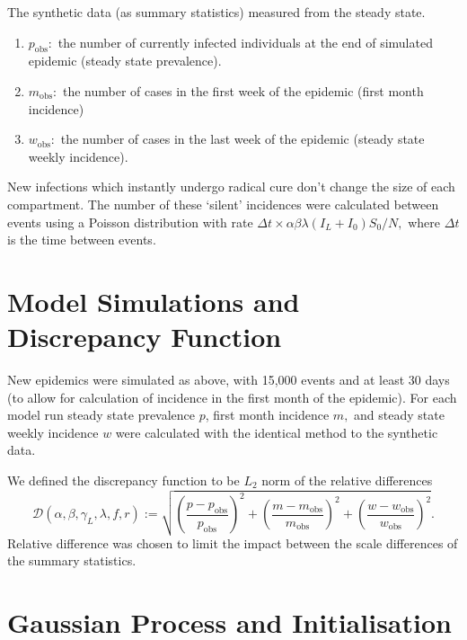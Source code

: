 The synthetic data (as summary statistics) measured from the steady state.
\begin{enumerate}
    \item $p_\text{obs}:$ the number of currently infected individuals at the
          end of simulated epidemic (steady state prevalence).
    \item $m_\text{obs}:$ the number of cases in the first week of the epidemic
          (first month incidence)
    \item $w_\text{obs}:$ the number of cases in the last week of the epidemic
          (steady state weekly incidence).
\end{enumerate}

New infections which instantly undergo radical cure don't change the size of
each compartment. The number of these `silent' incidences were calculated
between events using a Poisson distribution with rate
$\Delta t \times \alpha \beta \lambda (I_L + I_0) S_0 / N,$ where $\Delta t$ is
the time between events.

\section{Model Simulations and Discrepancy Function}

New epidemics were simulated as above, with 15,000 events and at least 30
days (to allow for calculation of incidence in the first month of the
epidemic). For each model run steady state prevalence $p$,
first month incidence $m,$ and steady state weekly incidence $w$ were
calculated with the identical method to the synthetic data.

We defined the discrepancy function to be $L_2$ norm of the relative
differences
$$
    \mathcal{D}(\alpha, \beta, \gamma_L, \lambda, f, r)
    := \sqrt{
        \left(\frac{p - p_\text{obs}}{p_\text{obs}}\right)^2
        + \left(\frac{m - m_\text{obs}}{m_\text{obs}}\right)^2
        + \left(\frac{w - w_\text{obs}}{w_\text{obs}}\right)^2
    }.
$$
Relative difference was chosen to limit the impact between the scale
differences of the summary statistics.

\section{Gaussian Process and Initialisation}

